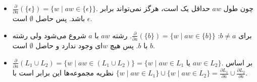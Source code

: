 \documentclass[../HW.tex]{subfiles}
\begin{document}
\begin{itemize}
\begin{itemize}
                  \item $\frac{\partial}{\partial a}(\{\epsilon\}) = \{ w \mid aw \in \{\epsilon\} \}$. چون طول $aw$ حداقل یک است، هرگز نمی‌تواند برابر $\epsilon$ باشد. پس حاصل $\emptyset$ است.

                  \item برای $b \neq a$: $\frac{\partial}{\partial a}(\{b\}) = \{ w \mid aw \in \{b\} \}$. رشته $aw$ با $a$ شروع می‌شود ولی رشته $b$ با $b$. پس هیچ $w$ای وجود ندارد و حاصل $\emptyset$ است.

                  \item $\frac{\partial}{\partial a}(L_1 \cup L_2) = \{ w \mid aw \in (L_1 \cup L_2) \} = \{ w \mid aw \in L_1 \text{ یا } aw \in L_2 \}$. بر اساس نظریه مجموعه‌ها این برابر است با $\{ w \mid aw \in L_1 \} \cup \{ w \mid aw \in L_2 \} = \frac{\partial L_1}{\partial a} \cup \frac{\partial L_2}{\partial a}$.


              \end{itemize}

              \vspace{0.5cm}


\end{itemize}
\end{document}
